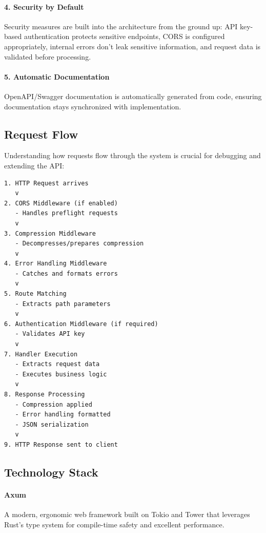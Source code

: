 \paragraph{4. Security by Default}
Security measures are built into the architecture from the ground up: API key-based authentication protects sensitive endpoints, CORS is configured appropriately, internal errors don't leak sensitive information, and request data is validated before processing.

\paragraph{5. Automatic Documentation}
OpenAPI/Swagger documentation is automatically generated from code, ensuring documentation stays synchronized with implementation.

\subsection{Request Flow}

Understanding how requests flow through the system is crucial for debugging and extending the API:

\begin{listing}[htbp]
\caption{HTTP Request Processing Pipeline}
\label{lst:request-flow}
\begin{verbatim}
1. HTTP Request arrives
   v
2. CORS Middleware (if enabled)
   - Handles preflight requests
   v
3. Compression Middleware
   - Decompresses/prepares compression
   v
4. Error Handling Middleware
   - Catches and formats errors
   v
5. Route Matching
   - Extracts path parameters
   v
6. Authentication Middleware (if required)
   - Validates API key
   v
7. Handler Execution
   - Extracts request data
   - Executes business logic
   v
8. Response Processing
   - Compression applied
   - Error handling formatted
   - JSON serialization
   v
9. HTTP Response sent to client
\end{verbatim}
\end{listing}

\subsection{Technology Stack}

\paragraph{Axum}
A modern, ergonomic web framework built on Tokio and Tower that leverages Rust's type system for compile-time safety and excellent performance.

